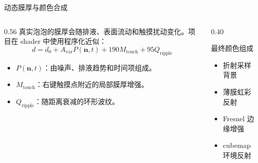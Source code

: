\documentclass[11pt,aspectratio=169]{beamer}
\begin{document}
\begin{frame}{动态膜厚与颜色合成}
  \begin{columns}[T]
    \begin{column}{0.56\linewidth}
      真实泡泡的膜厚会随排液、表面流动和触摸扰动变化。项目在 shader 中使用程序化近似：
      \[
        d =
        d_0
        + A_{\mathrm{var}} P(\mathbf{n},t)
        + 190M_{\mathrm{touch}}
        + 95Q_{\mathrm{ripple}}
      \]
      \begin{itemize}
        \item \(P(\mathbf{n},t)\)：由噪声、排液趋势和时间项组成。
        \item \(M_{\mathrm{touch}}\)：右键触摸点附近的局部膜厚增强。
        \item \(Q_{\mathrm{ripple}}\)：随距离衰减的环形波纹。
      \end{itemize}
    \end{column}
    \begin{column}{0.40\linewidth}
      \begin{block}{最终颜色组成}
        \begin{itemize}
          \item 折射采样背景
          \item 薄膜虹彩反射
          \item Fresnel 边缘增强
          \item cubemap 环境反射
        \end{itemize}
      \end{block}
    \end{column}
  \end{columns}
\end{frame}
\end{document}
